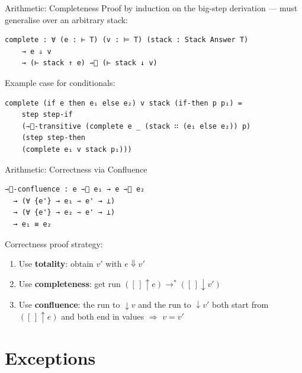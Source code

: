 \documentclass[10pt,compress,aspectratio=169]{beamer}
\begin{document}
\begin{frame}[fragile]{Arithmetic: Completeness}
  Proof by induction on the big-step derivation — must generalise over an arbitrary stack:

\begin{verbatim}
complete : ∀ (e : ⊢ T) (v : ⊨ T) (stack : Stack Answer T)
    → e ⇓ v
    → (⊢ stack ↑ e) ⇾⃰ (⊢ stack ↓ v)
\end{verbatim}

  Example case for conditionals:
\begin{verbatim}
complete (if e then e₁ else e₂) v stack (if-then p p₁) =
    step step-𝚒𝚏
    (⇾⃰-transitive (complete e _ (stack ∷ (e₁ 𝚎𝚕𝚜𝚎 e₂)) p)
    (step step-𝚝𝚑𝚎𝚗
    (complete e₁ v stack p₁)))
\end{verbatim}
\end{frame}

\begin{frame}[fragile]{Arithmetic: Correctness via Confluence}
\begin{verbatim}
⇾⃰-confluence : e ⇾⃰ e₁ → e ⇾⃰ e₂
  → (∀ {e'} → e₁ ⇾ e' → ⊥)
  → (∀ {e'} → e₂ ⇾ e' → ⊥)
  → e₁ ≡ e₂
\end{verbatim}

  \bigskip
  Correctness proof strategy:
  \begin{enumerate}
    \item Use \textbf{totality}: obtain $v'$ with $e \Downarrow v'$
    \item Use \textbf{completeness}: get run $([\,] \uparrow e) \longrightarrow^* ([\,] \downarrow v')$
    \item Use \textbf{confluence}: the run to $\downarrow v$ and the run to $\downarrow v'$ both start from $([\,]\uparrow e)$ and both end in values $\Rightarrow$ $v = v'$
  \end{enumerate}
\end{frame}

\section{Exceptions}
\end{document}
